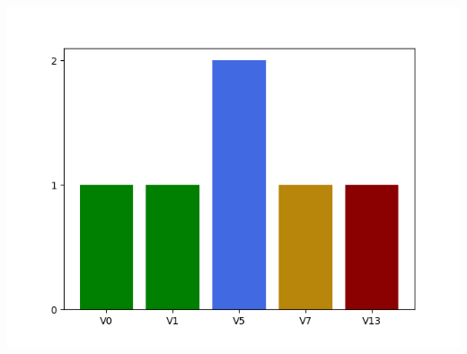 \raggedcolumns
\begin{multicols}{2}

\includegraphics[width=\linewidth]{./maps/plots//The Crops.png}
\end{multicols}
